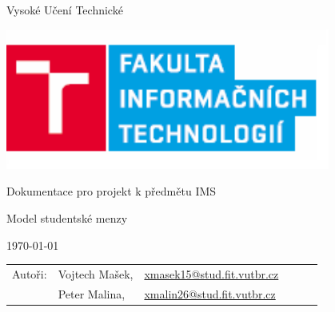 \documentclass{article}
\begin{document}
\begin{titlepage}
 
	\begin{center}
		\begin{LARGE}
			Vysoké Učení Technické \\
			\vspace{0.7cm}
		\end{LARGE}
		\vspace{2cm}
        
		\includegraphics[width=0.8\textwidth]{fitnew.png}

	\end{center}	
	
	\vfill
	\vspace{2cm}
	
	\begin{center}
		\begin{Large}
			Dokumentace pro projekt k předmětu IMS \\
		\end{Large}
		\bigskip
		\begin{Huge}
			 Model studentské menzy\\
		\end{Huge}
	\end{center}
 
	\vfill
 
	\begin{center}
		\begin{Large}
			\today
		\end{Large}
	\end{center}
 
	\vfill
 
	\begin{flushleft}
		\begin{large}
			\begin{tabular}{llllll}
				Autoři: & Vojtech Mašek,	& \url{xmasek15@stud.fit.vutbr.cz} & & \\
                		& Peter Malina, 	& \url{xmalin26@stud.fit.vutbr.cz} & & \\
			\end{tabular}
		\end{large}
	\end{flushleft}
\end{titlepage}
\end{document}

